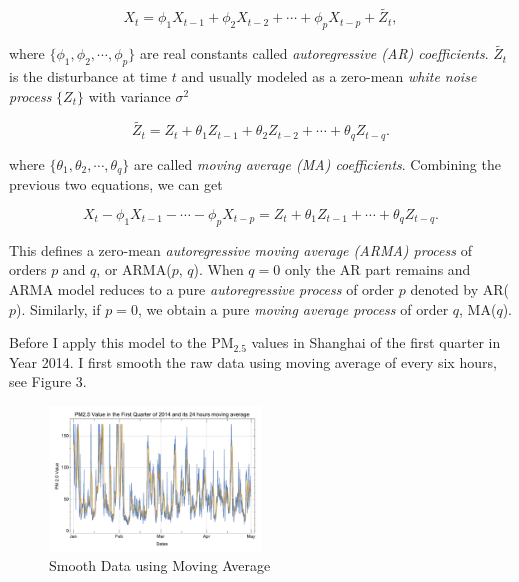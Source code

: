 \documentclass[letterpaper]{article}
\begin{document}
\begin{displaymath}
X_{t} = \phi_{1} X_{t-1} + \phi_{2} X_{t-2} + \cdots + \phi_{p} X_{t-p} + \tilde{Z_{t}},
\end{displaymath} 

\noindent where $\{ \phi_{1}, \phi_{2}, \cdots, \phi_{p} \}$ are real constants called \emph{autoregressive (AR) coefficients}. $\tilde{Z_{t}}$ is the disturbance at time $t$ and usually modeled as a zero-mean \emph{white noise process} $\{ Z_{t} \}$ with variance $\sigma^{2}$

\begin{displaymath}
\tilde{Z_{t}} = Z_{t} + \theta_{1} Z_{t-1} + \theta_{2} Z_{t-2} + \cdots + \theta_{q} Z_{t-q}.
\end{displaymath} 

\noindent where $\{ \theta_{1}, \theta_{2}, \cdots, \theta_{q} \}$ are called \emph{moving average (MA) coefficients}. Combining the previous two equations, we can get 

\begin{displaymath}
X_{t} - \phi_{1} X_{t-1} - \cdots - \phi_{p} X_{t-p} = Z_{t} + \theta_{1} Z_{t-1} + \cdots + \theta_{q} Z_{t-q}.
\end{displaymath} 

\noindent This defines a zero-mean \emph{autoregressive moving average (ARMA) process } of orders $p$ and $q$, or ARMA($p$, $q$). When $q=0$ only the AR part remains and ARMA model reduces to a pure \emph{autoregressive process} of order $p$ denoted by AR($p$). Similarly, if $p = 0$, we obtain a pure \emph{moving average process} of order $q$, MA($q$).

Before I apply this model to the $\text{PM}_{2.5}$ values in Shanghai of the first quarter in Year 2014. I first smooth the raw data using moving average of every six hours, see Figure 3. 

\begin{figure}[htbp]
	\centerline{\includegraphics[width=0.50\textwidth]{PM25_MovingAverage.pdf}}
	\caption{Smooth Data using Moving Average}\label{fig:digit}
\end{figure}
\end{document}

